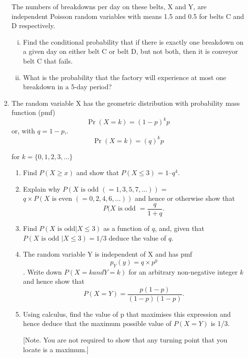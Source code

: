 \documentclass[a4paper,12pt]{article}
\begin{document}
\begin{enumerate}
The numbers of breakdowns per day on these belts, X and Y, are independent
Poisson random variables with means 1.5 and 0.5 for belts C and D
respectively.
\begin{enumerate}[(i)]
\item Find the conditional probability that if there is exactly one breakdown
on a given day on either belt C or belt D, but not both, then it is
conveyor belt C that fails.
\item  What is the probability that the factory will experience at most one
breakdown in a 5-day period?
\end{enumerate}


\item The random variable X has the geometric distribution with probability mass function (pmf)   
$$ {\displaystyle \Pr(X=k)=(1-p)^{k}p}$$ or, with $q = 1 - p$,.
$$ {\displaystyle \Pr(X=k)=(q)^{k}p}$$

for $k = \{0, 1, 2, 3, \ldots \}$ 
\begin{enumerate}
\item Find $P(X \geq x)$ and show that $P(X \leq 3)$ = $1 – q^4$. 
\item Explain why $P(X \mbox{ is odd }(= 1, 3, 5, 7, ...))$ = $q × P(X\mbox{ is even }(= 0, 2, 4, 6, ...))$ and hence or otherwise show that 
$$ P(X \mbox{ is odd } =  \frac{q}{1+q}.$$

\item Find $P(X \mbox{ is odd}|X\leq 3)$ as a function of $q$, and, given that $P(X \mbox{ is odd }|X\leq 3)=1/3$ deduce the value of $q$.  
\item The random variable Y is independent of X and has pmf $$ p_Y(y) =q\times p^y $$. 
\noindent Write down $P(X = k and Y = k)$ for an arbitrary non-negative integer $k$ and hence show that $$ P(X = Y) =  \frac{p(1-p)}{(1-p)(1-p)}.$$ 

\item Using calculus, find the value of p that maximises this expression and hence deduce that the maximum possible value of $P(X = Y)$ is 1/3. 

[Note. You are not required to show that any turning point that you locate is a maximum.] 
\end{enumerate}




\end{enumerate}
\end{document}
